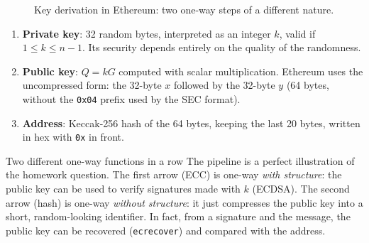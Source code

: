 \begin{figure}[H]
  \centering
  \caption{Key derivation in Ethereum: two one-way steps of a different nature.}
  \label{fig:eth}
\end{figure}

\begin{enumerate}
  \item \textbf{Private key}: 32 random bytes, interpreted as an integer $k$, valid if $1 \le k \le n-1$. Its security depends entirely on the quality of the randomness.
  \item \textbf{Public key}: $Q = kG$ computed with scalar multiplication. Ethereum uses the uncompressed form: the 32-byte $x$ followed by the 32-byte $y$ (64 bytes, without the \texttt{0x04} prefix used by the SEC format).
  \item \textbf{Address}: Keccak-256 hash of the 64 bytes, keeping the last 20 bytes, written in hex with \texttt{0x} in front.
\end{enumerate}

\begin{framedobs}{Two different one-way functions in a row}
  The pipeline is a perfect illustration of the homework question. The first arrow (ECC) is one-way \textit{with structure}: the public key can be used to verify signatures made with $k$ (ECDSA). The second arrow (hash) is one-way \textit{without structure}: it just compresses the public key into a short, random-looking identifier. In fact, from a signature and the message, the public key can be recovered (\texttt{ecrecover}) and compared with the address.
\end{framedobs}
